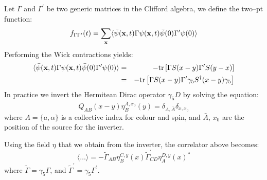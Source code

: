 \documentclass{article}[12pt]
\def\bfx{{\bf x}}
\begin{document}
\noindent
Let $\Gamma$ and $\Gamma^\prime$ be two generic matrices in the
Clifford algebra, we define the two--pt function:
%
\begin{equation}
f_{\Gamma\Gamma^\prime}(t) = \sum_\bfx \langle \bar\psi(\bfx,t) \Gamma
\psi(\bfx,t) \bar\psi(0) \Gamma^\prime \psi(0) \rangle
\end{equation}
%
Performing the Wick contractions yields:
%
\begin{eqnarray}
\langle \bar\psi(\bfx,t) \Gamma
\psi(\bfx,t) \bar\psi(0) \Gamma^\prime \psi(0) \rangle &=&
- \mathrm{tr} \left[ \Gamma S(x-y) \Gamma^\prime S(y-x) \right] 
\nonumber \\
&=& - \mathrm{tr} \left[ \Gamma S(x-y) \Gamma^\prime \gamma_5 
S^\dagger(x-y) \gamma_5 \right] \nonumber 
\end{eqnarray}
%
In practice we invert the Hermitean Dirac operator $\gamma_5 D$ by
solving the equation:
%
\begin{equation}
Q_{AB}(x-y) \eta^{\bar A,x_0}_B(y) = \delta_{A,\bar A} \delta_{x,x_0}
\end{equation}
%
where $A=\{a,\alpha\}$ is a collective index for colour and spin, and
$\bar A$, $x_0$ are the position of the source for the inverter. 

Using the field $\eta$ that we obtain from the inverter, the
correlator above becomes:
%
\begin{equation}
\langle \ldots \rangle = - \tilde \Gamma_{AB} \eta^{C,y}_B(x)
\tilde \Gamma^\prime_{CD} \eta^{D,y}_A(x)^*
\end{equation}
where $\tilde \Gamma= \gamma_5 \Gamma$, and $\tilde \Gamma^\prime =
\gamma_5 \Gamma^\prime$.


\end{document}
